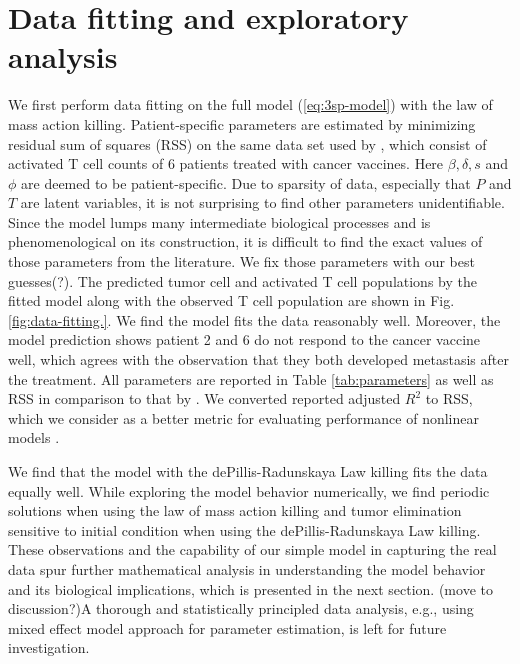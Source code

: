 \documentclass[review,authoryear]{elsarticle}
\begin{document}
\section{Data fitting and exploratory analysis} \label{sec:data}
We first perform data fitting on the full model (\ref{eq:3sp-model}) with the law of mass action killing. Patient-specific parameters are estimated by minimizing residual sum of squares (RSS) on the same data set used by \cite{Messan2021}, which consist of activated T cell counts of 6 patients treated with cancer vaccines. Here $\beta, \delta, s$ and $\phi$ are deemed to be patient-specific. Due to sparsity of data, especially that $P$ and $T$ are latent variables, it is not surprising to find other parameters unidentifiable.  Since the model lumps many intermediate biological processes and is phenomenological on its construction, it is difficult to find the exact values of those parameters from the literature. We fix those parameters with our best guesses(?). The predicted tumor cell and activated T cell populations by the fitted model along with the observed T cell population are shown in Fig. \ref{fig:data-fitting.}. We find the model fits the data reasonably well. Moreover, the model prediction shows patient 2 and 6 do not respond to the cancer vaccine well, which agrees with the observation that they both developed metastasis after the treatment. All parameters are reported in Table \ref{tab:parameters} as well as RSS in comparison to that by \cite{Messan2021}. We converted \cite{Messan2021} reported adjusted $R^2$ to RSS, which we consider as a better metric for evaluating performance of nonlinear models \citep{Spiess2010}.

We find that the model with the dePillis-Radunskaya Law killing fits the data equally well. While exploring the model behavior numerically, we find periodic solutions when using the law of mass action killing and tumor elimination sensitive to initial condition when using the dePillis-Radunskaya Law killing. These observations and the capability of our simple model in capturing the real data spur further mathematical analysis in understanding the model behavior and its biological implications, which is presented in the next section. (move to discussion?)A thorough and statistically principled data analysis, e.g., using mixed effect model approach for parameter estimation, is left for future investigation. 
\end{document}
